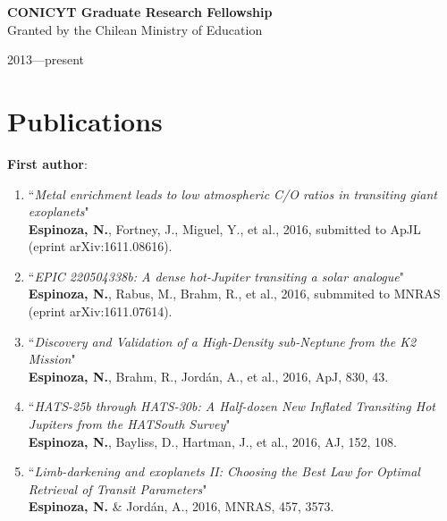 \documentclass[11pt, a4paper]{article} %
\begin{document}
\begin{minipage}[t]{0.7\textwidth}
\begin{flushleft}%
  \setlength{\leftskip}{0.2cm}%
\textbf{CONICYT Graduate Research Fellowship}\\
Granted by the Chilean Ministry of Education
\end{flushleft}
\end{minipage}
\begin{minipage}[t]{0.3\textwidth}
\hfill 2013---present
\end{minipage}

\section*{Publications}
\begin{flushleft}%
  \setlength{\leftskip}{0.2cm}%
\textbf{First author}:
\begin{enumerate}
\setlength\itemsep{0.05cm}
\item ``\textit{Metal enrichment leads to low atmospheric C/O ratios in transiting giant exoplanets}"\\
          \textbf{Espinoza, N.}, Fortney, J., Miguel, Y., et al., 2016, submitted to ApJL (eprint arXiv:1611.08616).

\item ``\textit{EPIC 220504338b: A dense hot-Jupiter transiting a solar analogue}"\\
          \textbf{Espinoza, N.}, Rabus, M., Brahm, R., et al., 2016, submmited to MNRAS (eprint arXiv:1611.07614).

\item ``\textit{Discovery and Validation of a High-Density sub-Neptune from the K2 Mission}"\\
          \textbf{Espinoza, N.}, Brahm, R., Jord\'an, A., et al., 2016, ApJ, 830, 43.

\item ``\textit{HATS-25b through HATS-30b: A Half-dozen New Inflated Transiting Hot Jupiters from the HATSouth Survey}"\\
          \textbf{Espinoza, N.}, Bayliss, D., Hartman, J., et al., 2016, AJ, 152, 108.

\item ``\textit{Limb-darkening and exoplanets II: Choosing the Best Law for Optimal Retrieval of Transit Parameters}"\\
          \textbf{Espinoza, N.} \& Jord\'an, A., 2016, MNRAS, 457, 3573.
          

\end{enumerate}
\end{flushleft}
\end{document}
